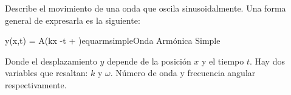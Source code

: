 Describe el movimiento de una onda que oscila sinusoidalmente. Una forma general de expresarla es la siguiente:

\begin{listequbox}
  {y(x,t) = A\sin(kx -\omega t + \phi)}{equarmsimple}{Onda Armónica Simple}
\end{listequbox}

Donde el desplazamiento $y$ depende de la posición $x$ y el tiempo $t$. Hay dos variables que resaltan: $k$ y $\omega$. Número de onda y frecuencia angular respectivamente.
